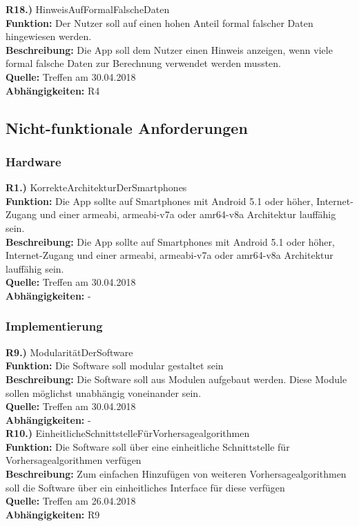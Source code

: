 \documentclass[12pt]{article} %
\begin{document}
\textbf{R18.)} HinweisAufFormalFalscheDaten \\
\textbf{Funktion:} Der Nutzer soll auf einen hohen Anteil formal falscher Daten hingewiesen werden. \\
\textbf{Beschreibung:} Die App soll dem Nutzer einen Hinweis anzeigen, wenn viele formal falsche Daten zur Berechnung verwendet werden mussten.\\
\textbf{Quelle:} Treffen am 30.04.2018 \\
\textbf{Abhängigkeiten:} R4 \\


\subsection{Nicht-funktionale Anforderungen}

\subsubsection{Hardware}

\textbf{R1.)} KorrekteArchitekturDerSmartphones \\
\textbf{Funktion:} Die App sollte auf Smartphones mit Android 5.1 oder höher, Internet-Zugang und einer armeabi, armeabi-v7a oder amr64-v8a Architektur lauffähig sein. \\
\textbf{Beschreibung:} Die App sollte auf Smartphones mit Android 5.1 oder höher, Internet-Zugang und einer armeabi, armeabi-v7a oder amr64-v8a Architektur lauffähig sein. \\
\textbf{Quelle:} Treffen am 30.04.2018 \\
\textbf{Abhängigkeiten:} - \\

\subsubsection{Implementierung}

\textbf{R9.)} ModularitätDerSoftware\\
\textbf{Funktion:} Die Software soll modular gestaltet sein\\
\textbf{Beschreibung:} Die Software soll aus Modulen aufgebaut werden. Diese Module sollen möglichst unabhängig voneinander sein.\\
\textbf{Quelle:} Treffen am 30.04.2018\\
\textbf{Abhängigkeiten:} -\\

\textbf{R10.)} EinheitlicheSchnittstelleFürVorhersagealgorithmen\\
\textbf{Funktion:} Die Software soll über eine einheitliche Schnittstelle für Vorhersagealgorithmen verfügen\\
\textbf{Beschreibung:} Zum einfachen Hinzufügen von weiteren Vorhersagealgorithmen soll die Software über ein einheitliches Interface für diese verfügen\\
\textbf{Quelle:} Treffen am 26.04.2018\\
\textbf{Abhängigkeiten:} R9\\
\end{document}
